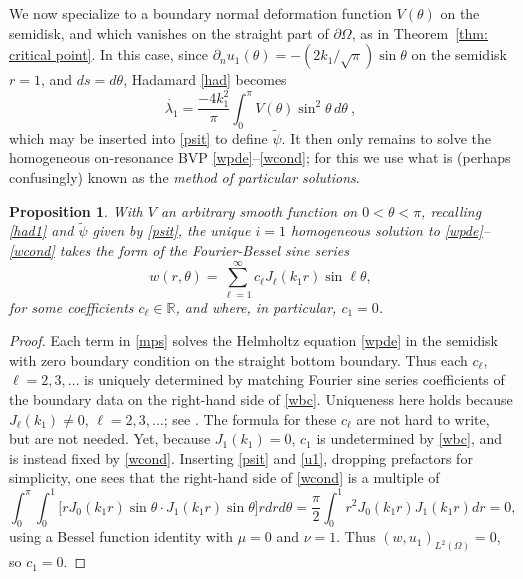 \documentclass{amsart}
\newcommand{\be}{\begin{equation}}
\newcommand{\ee}{\end{equation}}
\newcommand{\R}{\mathbb{R}}
\newcommand{\pO}{{\partial\Omega}}
\theoremstyle{plain}
\newtheorem{prop}[theorem]{Proposition}
\begin{document}
We now specialize to a boundary normal deformation function $V(\theta)$ on the
semidisk, and which vanishes on the straight part of $\pO$,
as in Theorem~\ref{thm: critical point}.
In this case, since $\partial_n u_1(\theta) = -(2k_1/\sqrt{\pi})\sin\theta$
on the semidisk $r=1$, and $ds = d\theta$, Hadamard \eqref{had} becomes
\be
\dot{\lambda_1} = \frac{-4k_1^2}{\pi}\int_0^\pi V(\theta)\sin^2 \theta\, d\theta~,
\label{had1}
\ee
which may be inserted into \eqref{psit} to define $\tilde\psi$.
It then only remains to solve the homogeneous on-resonance BVP
\eqref{wpde}--\eqref{wcond}; for this we use what
is (perhaps confusingly)
known as the {\em method of particular solutions}.

\begin{prop}  %
  With $V$ an arbitrary smooth function on $0<\theta<\pi$,
  recalling \eqref{had1} and $\tilde\psi$ given by \eqref{psit},
  the unique $i=1$ homogeneous solution to
  \eqref{wpde}--\eqref{wcond} takes the form of the Fourier-Bessel sine series
\be
w(r,\theta) = \sum_{\ell=1}^\infty c_\ell J_\ell(k_1r)\sin \ell \theta,
\label{mps}
\ee
for some coefficients $c_\ell\in\R$, and where, in particular, $c_1=0$.
\label{p:mps}
\end{prop}
\begin{proof}
  Each term in \eqref{mps} solves the Helmholtz equation \eqref{wpde} in the semidisk
  with zero boundary condition on the straight bottom boundary.
  Thus each $c_\ell$, $\ell=2,3,\dots$ is uniquely determined by
  matching Fourier sine series coefficients of the boundary
  data on the right-hand side of \eqref{wbc}.
  Uniqueness here holds because $J_\ell(k_1) \neq 0$, $\ell=2,3,\dots$;
  see \cite[\S 10.21(i)]{dlmf}.
  The formula for these $c_\ell$ are not hard to write, but are not needed.
  Yet, because $J_1(k_1)=0$, $c_1$ is undetermined by \eqref{wbc}, and is
  instead
  fixed by \eqref{wcond}.
  Inserting \eqref{psit} and \eqref{u1}, dropping prefactors for simplicity,
  one sees that the right-hand side of \eqref{wcond} is a multiple
  of
  $$
  \int_0^\pi \int_0^1 \bigl[
    rJ_0(k_1 r)\sin\theta \cdot J_1(k_1 r) \sin\theta
    \bigr] rdrd\theta =
  \frac{\pi}{2} \int_0^1 r^2 J_0(k_1 r)J_1(k_1 r) dr = 0,
  $$
  using a Bessel function identity \cite[(10.22.7)]{dlmf} with $\mu=0$ and $\nu=1$.
  Thus $(w,u_1)_{L^2(\Omega)} = 0$, so $c_1=0$.
\end{proof}
\end{document}
